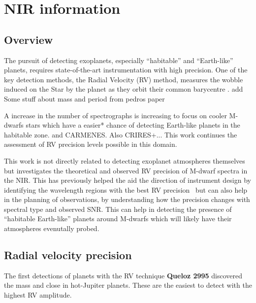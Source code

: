 
\chapter{NIR information}

\label{cha:nir_content}

\section{Overview}

The pursuit of detecting exoplanets, especially ``habitable'' and ``Earth-like'' planets, requires state-of-the-art instrumentation with high precision. One of the key detection methods, the Radial Velocity (RV) method, measures the wobble induced on the Star by the planet as they orbit their common barycentre .  {\red{} add Some stuff about mass and period from pedros paper}



A increase in the number of \nir{} spectrographs is increasing to focus on cooler M-dwarfs stars which have a easier* chance of detecting Earth-like planets in the habitable zone.  and CARMENES. Also CRIRES+...
This work continues the assessment of RV precision levels possible in this domain.




This work is not directly related to detecting exoplanet atmospheres themselves but investigates the theoretical and observed RV precision of M-dwarf spectra in the NIR. This has previously helped the aid the direction of instrument design by identifying the wavelength regions with the best RV precision~\citep{figueira_radial_2016} but can also help in the planning of observations, by understanding how the precision changes with spectral type and observed SNR. This can help in detecting the presence of ``habitable Earth-like'' planets around M-dwarfs which will likely have their atmospheres evenutally probed.


\section{Radial velocity precision}
The first detections of planets with the RV technique \textbf{Queloz 2995} discovered the mass and close in hot-Jupiter planets. These are the easiest to detect with the highest RV amplitude.


